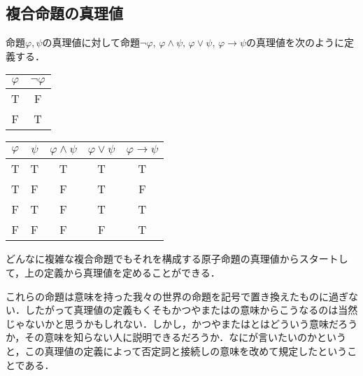 \documentclass[10pt,b5paper,papersize,dvipdfmx]{jsbook}
\begin{document}
\subsection{複合命題の真理値}
命題$\varphi, \psi$の真理値に対して命題$\lnot\varphi,\, \varphi\land\psi,\, \varphi\lor\psi,\, \varphi\to\psi$の真理値を次のように定義する．\par
\begin{table}[H]
  \begin{minipage}[t]{.45\textwidth}
    \centering
    \begin{tabular}{c|c}\hline
      $\varphi$ & $\lnot\varphi$ \\ \hline
      T & F \\
      F & T \\ \hline
    \end{tabular}
  \end{minipage}
  \hfill
  \begin{minipage}[t]{.45\textwidth}
    \centering
    \begin{tabular}{cc|ccc}\hline
      $\varphi$ & $\psi$ & $\varphi\land\psi$ & $\varphi\lor\psi$ & $\varphi\to\psi$ \\ \hline
      T & T & T & T & T \\
      T & F & F & T & F \\
      F & T & F & T & T \\
      F & F & F & F & T \\ \hline
    \end{tabular}
  \end{minipage}
\end{table}
どんなに複雑な複合命題でもそれを構成する原子命題の真理値からスタートして，上の定義から真理値を定めることができる．\par
これらの命題は意味を持った我々の世界の命題を記号で置き換えたものに過ぎない．したがって真理値の定義もくそもかつやまたはの意味からこうなるのは当然じゃないかと思うかもしれない．しかし，かつやまたはとはどういう意味だろうか，その意味を知らない人に説明できるだろうか．なにが言いたいのかというと，この真理値の定義によって否定詞と接続しの意味を改めて規定したということである．
\end{document}
